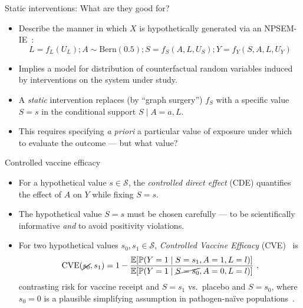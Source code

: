 \documentclass{beamer}
\begin{document}

\begin{frame}[c]{Static interventions: What are they good for?}

\begin{center}
\begin{itemize}
  \itemsep8pt
  \item Describe the manner in which $X$ is hypothetically generated via an
    NPSEM-IE~\citep{pearl2009causality}:
    \begin{equation*}
      L = f_L(U_L); A \sim \text{Bern}(0.5);
      S = f_S(A, L, U_S); Y = f_Y(S, A, L, U_Y)
    \end{equation*}
  \item Implies a model for distribution of counterfactual random variables
    induced by interventions on the system under study.
  \item A \textit{static} intervention replaces (by ``graph surgery'') $f_S$
    with a specific value $S=s$ in the conditional support $S \mid A = a, L$.
  \item This requires specifying \textit{a priori} a particular value of
    exposure under which to evaluate the outcome --- but what value?
\end{itemize}
\end{center}

\note{
}

\end{frame}


\begin{frame}[c]{Controlled vaccine efficacy}

\begin{center}
\begin{itemize}
  \itemsep8pt
  \item For a hypothetical value $s \in \mathcal{S}$, the \textit{controlled
    direct effect} (CDE) quantifies the effect of $A$ on $Y$ while fixing
    $S = s$.
  \item The hypothetical value $S = s$ must be chosen carefully --- to
    be scientifically informative \textit{and} to avoid positivity violations.
  \item For two hypothetical values $s_0, s_1 \in \mathcal{S}$,
    \textit{Controlled Vaccine Efficacy} (CVE)~\citep{gilbert2022controlled} is
  \begin{equation*}
    \text{CVE}(\cancel{s_0}, s_1) = 1 -
      \frac{\mathbb{E}[\mathbb{P}(Y = 1 \mid S = s_1, A = 1, L = l)]}
      {\mathbb{E}[\mathbb{P}(Y = 1 \mid \cancel{S = s_0}, A = 0, L = l)]} \ ,
  \end{equation*}
  contrasting risk for vaccine receipt and $S = s_1$ vs.~placebo and $S = s_0$,
  where $s_0 = 0$ is a plausible simplifying assumption in pathogen-na\"ive
  populations~\citep{gilbert2024four}.
\end{itemize}
\end{center}

\note{
}

\end{frame}
\end{document}
